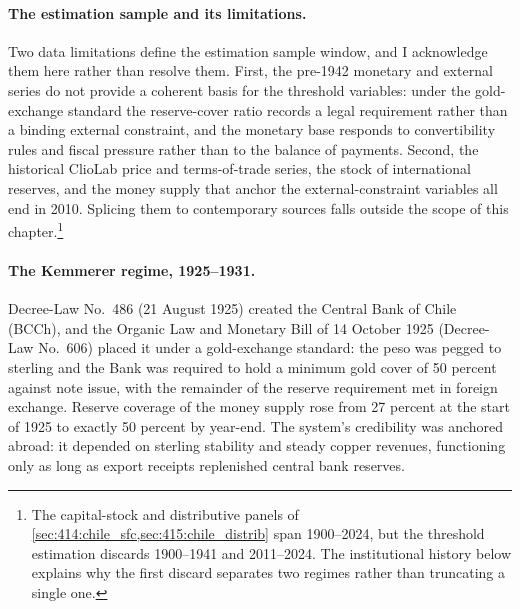 \paragraph{The estimation sample and its limitations.}
Two data limitations define the estimation sample window, and I acknowledge them here rather than resolve them. First, the pre-1942 monetary and external series do not provide a coherent basis for the threshold variables: under the gold-exchange standard the reserve-cover ratio records a legal requirement rather than a binding external constraint, and the monetary base responds to convertibility rules and fiscal pressure rather than to the balance of payments. Second, the historical ClioLab price and terms-of-trade series, the stock of international reserves, and the money supply that anchor the external-constraint variables all end in 2010. Splicing them to contemporary sources falls outside the scope of this chapter.\footnote{The capital-stock and distributive panels of \cref{sec:414:chile_sfc,sec:415:chile_distrib} span 1900--2024, but the threshold estimation discards 1900--1941 and 2011--2024. The institutional history below explains why the first discard separates two regimes rather than truncating a single one.}


\paragraph{The Kemmerer regime, 1925--1931.}
Decree-Law No.~486 (21 August 1925) created the Central Bank of Chile (BCCh), and the Organic Law and Monetary Bill of 14 October 1925 (Decree-Law No.~606) placed it under a gold-exchange standard: the peso was pegged to sterling and the Bank was required to hold a minimum gold cover of 50 percent against note issue, with the remainder of the reserve requirement met in foreign exchange. Reserve coverage of the money supply rose from 27 percent at the start of 1925 to exactly 50 percent by year-end. The system's credibility was anchored abroad: it depended on sterling stability and steady copper revenues, functioning only as long as export receipts replenished central bank reserves.

